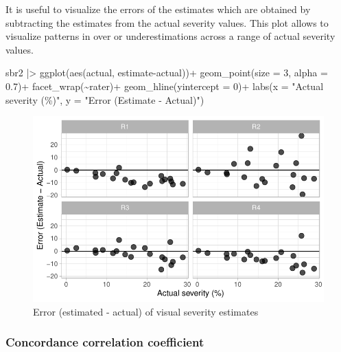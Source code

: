 \documentclass[
  letterpaper,
  DIV=11,
  numbers=noendperiod]{scrreprt}
\newenvironment{Shaded}{\begin{snugshade}}{\end{snugshade}}
\newcommand{\AttributeTok}[1]{\textcolor[rgb]{0.40,0.45,0.13}{#1}}
\newcommand{\DecValTok}[1]{\textcolor[rgb]{0.68,0.00,0.00}{#1}}
\newcommand{\FloatTok}[1]{\textcolor[rgb]{0.68,0.00,0.00}{#1}}
\newcommand{\FunctionTok}[1]{\textcolor[rgb]{0.28,0.35,0.67}{#1}}
\newcommand{\NormalTok}[1]{\textcolor[rgb]{0.00,0.23,0.31}{#1}}
\newcommand{\SpecialCharTok}[1]{\textcolor[rgb]{0.37,0.37,0.37}{#1}}
\newcommand{\StringTok}[1]{\textcolor[rgb]{0.13,0.47,0.30}{#1}}
\begin{document}
It is useful to visualize the errors of the estimates which are obtained
by subtracting the estimates from the actual severity values. This plot
allows to visualize patterns in over or underestimations across a range
of actual severity values.

\begin{Shaded}
\begin{Highlighting}[]
\NormalTok{sbr2 }\SpecialCharTok{|\textgreater{}} 
  \FunctionTok{ggplot}\NormalTok{(}\FunctionTok{aes}\NormalTok{(actual, estimate}\SpecialCharTok{{-}}\NormalTok{actual))}\SpecialCharTok{+}
  \FunctionTok{geom\_point}\NormalTok{(}\AttributeTok{size =} \DecValTok{3}\NormalTok{, }\AttributeTok{alpha =} \FloatTok{0.7}\NormalTok{)}\SpecialCharTok{+}
  \FunctionTok{facet\_wrap}\NormalTok{(}\SpecialCharTok{\textasciitilde{}}\NormalTok{rater)}\SpecialCharTok{+}
  \FunctionTok{geom\_hline}\NormalTok{(}\AttributeTok{yintercept =} \DecValTok{0}\NormalTok{)}\SpecialCharTok{+}
  \FunctionTok{labs}\NormalTok{(}\AttributeTok{x =} \StringTok{"Actual severity (\%)"}\NormalTok{,}
       \AttributeTok{y =} \StringTok{"Error (Estimate {-} Actual)"}\NormalTok{)}
\end{Highlighting}
\end{Shaded}

\begin{figure}[H]

{\centering \includegraphics{data-accuracy_files/figure-pdf/fig-errors-1.pdf}

}

\caption{\label{fig-errors}Error (estimated - actual) of visual severity
estimates}

\end{figure}

\hypertarget{concordance-correlation-coefficient}{%
\subsubsection{Concordance correlation
coefficient}\label{concordance-correlation-coefficient}}
\end{document}
